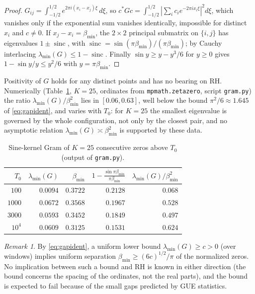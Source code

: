 \documentclass[11pt]{amsart}
\theoremstyle{definition}
\theoremstyle{remark}
\newtheorem{remark}[theorem]{Remark}
\newcommand{\bmin}{\beta_{\min}}
\begin{document}
\begin{proof}
$G_{ij}=\int_{-1/2}^{1/2}e^{2\pi i(x_i-x_j)\xi}\,d\xi$, so $c^*Gc=\int_{-1/2}^{1/2}|\sum_ic_ie^{-2\pi ix_i\xi}|^2d\xi$,
which vanishes only if the exponential sum vanishes identically, impossible for distinct $x_i$ and $c\ne0$.
If $x_j-x_i=\bmin$, the $2\times2$ principal submatrix on $\{i,j\}$ has eigenvalues $1\pm\operatorname{sinc}$,
with $\operatorname{sinc}=\sin(\pi\bmin)/(\pi\bmin)$; by Cauchy interlacing $\lambda_{\min}(G)\le1-\operatorname{sinc}$.
Finally $\sin y\ge y-y^3/6$ for $y\ge0$ gives $1-\sin y/y\le y^2/6$ with $y=\pi\bmin$.
\end{proof}

Positivity of $G$ holds for any distinct points and has no bearing on RH. Numerically (Table~\ref{tab:gram},
$K=25$, ordinates from \texttt{mpmath.zetazero}, script \texttt{gram.py}) the ratio
$\lambda_{\min}(G)/\bmin^2$ lies in $[0.06,0.63]$, well below the bound $\pi^2/6\approx1.645$ of
\eqref{eq:gapident}, and varies with $T_0$: for $K=25$ the smallest eigenvalue is governed by the whole
configuration, not only by the closest pair, and no asymptotic relation $\lambda_{\min}(G)\asymp\bmin^2$ is
supported by these data.

\begin{table}[ht]
\centering
\begin{tabular}{rrrrr}
\toprule
$T_0$ & $\lambda_{\min}(G)$ & $\bmin$ & $1-\frac{\sin\pi\bmin}{\pi\bmin}$ & $\lambda_{\min}(G)/\bmin^2$ \\
\midrule
$100$ & $0.0094$ & $0.3722$ & $0.2128$ & $0.068$ \\
$1000$ & $0.0672$ & $0.3568$ & $0.1967$ & $0.528$ \\
$3000$ & $0.0593$ & $0.3452$ & $0.1849$ & $0.497$ \\
$10^4$ & $0.0609$ & $0.3125$ & $0.1531$ & $0.624$ \\
\bottomrule
\end{tabular}
\caption{Sine-kernel Gram of $K=25$ consecutive zeros above $T_0$ (output of \texttt{gram.py}).}\label{tab:gram}
\end{table}

\begin{remark}\label{cor:price}
By \eqref{eq:gapident}, a uniform lower bound $\lambda_{\min}(G)\ge c>0$ (over windows) implies uniform
separation $\bmin\ge(6c)^{1/2}/\pi$ of the normalized zeros. No implication between such a bound and RH is
known in either direction (the bound concerns the spacing of the ordinates, not the real parts), and the bound
is expected to fail because of the small gaps predicted by GUE statistics.
\end{remark}
\end{document}
